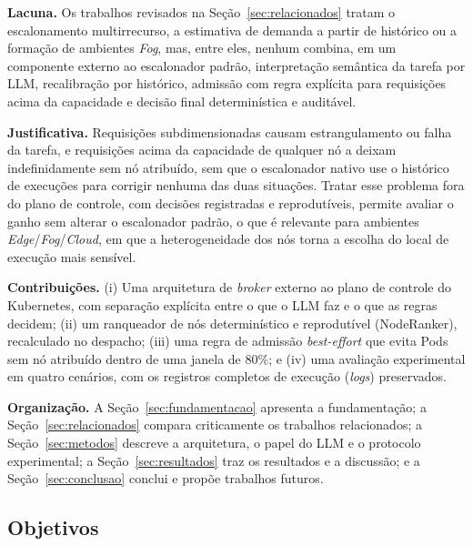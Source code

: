 \documentclass[11pt,a4paper]{article}
\begin{document}
\textbf{Lacuna.} Os trabalhos revisados na Seção~\ref{sec:relacionados}
tratam o escalonamento multirrecurso, a estimativa de demanda a partir de
histórico ou a formação de ambientes \textit{Fog}, mas, entre eles, nenhum
combina, em um componente externo ao escalonador padrão, interpretação
semântica da tarefa por LLM, recalibração por histórico, admissão com regra
explícita para requisições acima da capacidade e decisão final
determinística e auditável.

\textbf{Justificativa.} Requisições subdimensionadas causam estrangulamento
ou falha da tarefa, e requisições acima da capacidade de qualquer nó a deixam
indefinidamente sem nó atribuído, sem que o escalonador nativo use o
histórico de execuções para corrigir nenhuma das duas situações. Tratar esse
problema fora do plano de controle, com decisões registradas e reprodutíveis,
permite avaliar o ganho sem alterar o escalonador padrão, o que é relevante
para ambientes \textit{Edge}/\textit{Fog}/\textit{Cloud}, em que a
heterogeneidade dos nós torna a escolha do local de execução mais sensível.

\textbf{Contribuições.} (i) Uma arquitetura de \textit{broker} externo ao
plano de controle do Kubernetes, com separação explícita entre o que o LLM
faz e o que as regras decidem; (ii) um ranqueador de nós determinístico e
reprodutível (NodeRanker), recalculado no despacho; (iii) uma regra de
admissão \textit{best-effort} que evita Pods sem nó atribuído dentro de uma
janela de $80\%$; e (iv) uma avaliação experimental em quatro cenários, com
os registros completos de execução (\textit{logs}) preservados.

\textbf{Organização.} A Seção~\ref{sec:fundamentacao} apresenta a
fundamentação; a Seção~\ref{sec:relacionados} compara criticamente os
trabalhos relacionados; a Seção~\ref{sec:metodos} descreve a arquitetura, o
papel do LLM e o protocolo experimental; a Seção~\ref{sec:resultados} traz os
resultados e a discussão; e a Seção~\ref{sec:conclusao} conclui e propõe
trabalhos futuros.

\subsection{Objetivos}\label{sec:objetivos}
\end{document}
